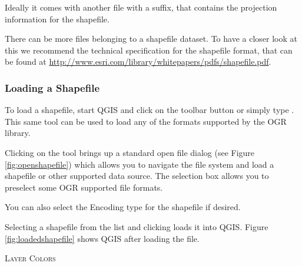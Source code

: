 Ideally it comes with another file with a  suffix, that contains
the projection information for the shapefile.

There can be more files belonging to a shapefile dataset.
To have a closer look at this we recommend the technical specification for the shapefile format,
that can be found at \url{http://www.esri.com/library/whitepapers/pdfs/shapefile.pdf}.

\subsubsection{Loading a Shapefile}\label{sec:load_shapefile}
To load a shapefile, start
QGIS and click on the 
toolbar button or simply type . This same tool can be used to
load any of the formats supported by the OGR library.

Clicking on the tool brings up a standard open file dialog (see Figure
\ref{fig:openshapefile}) which allows you to navigate the file system and load
a shapefile or other supported data source. 
The selection box  allows you to preselect some OGR supported file formats.

You can also select the Encoding type for the shapefile if desired.


Selecting a shapefile from the list and clicking  loads it into QGIS. Figure
\ref{fig:loadedshapefile} shows QGIS after loading the  file.


\begin{Tip}\caption{\textsc{Layer Colors}}
\end{Tip}


